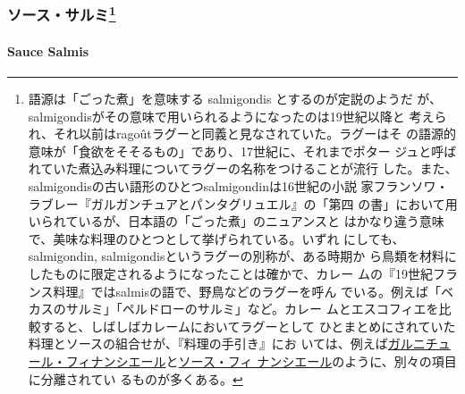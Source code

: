 \begin{recette}
{\subsubsection[ソース・サルミ]{\texorpdfstring{ソース・サルミ\footnote{語源は「ごった煮」を意味する
  salmigondis とするのが定説のようだ
  が、salmigondisがその意味で用いられるようになったのは19世紀以降と
  考えられ、それ以前はragoûtラグーと同義と見なされていた。ラグーはそ
  の語源的意味が「食欲をそそるもの」であり、17世紀に、それまでポター
  ジュと呼ばれていた煮込み料理についてラグーの名称をつけることが流行
  した。また、salmigondisの古い語形のひとつsalmigondinは16世紀の小説
  家フランソワ・ラブレー『ガルガンチュアとパンタグリュエル』の「第四
  の書」において用いられているが、日本語の「ごった煮」のニュアンスと
  はかなり違う意味で、美味な料理のひとつとして挙げられている。いずれ
  にしても、salmigondin, salmigondisというラグーの別称が、ある時期か
  ら鳥類を材料にしたものに限定されるようになったことは確かで、カレー
  ムの『19世紀フランス料理』ではsalmisの語で、野鳥などのラグーを呼ん
  でいる。例えば「ベカスのサルミ」「ペルドローのサルミ」など。カレー
  ムとエスコフィエを比較すると、しばしばカレームにおいてラグーとして
  ひとまとめにされていた料理とソースの組合せが、『料理の手引き』にお
  いては、例えば\protect\hyperlink{}{ガルニチュール・フィナンシエール}と\protect\hyperlink{sauce-financiere}{ソース・フィ
  ナンシエール}のように、別々の項目に分離されてい るものが多くある。}}{ソース・サルミ}}\label{ux30bdux30fcux30b9ux30b5ux30ebux30df92}}

\hypertarget{sauce-salmis}{%
\paragraph{Sauce Salmis}\label{sauce-salmis}}



\end{recette}

